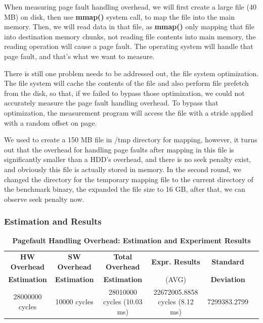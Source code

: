 When measuring page fault handling overhead, we will first create a large file (40 MB) on disk, then use \textbf{mmap()} system call, to map the file into the main memory. Then, we will read data in that file, as \textbf{mmap()} only mapping that file into destination memory chunks, not reading file contents into main memory, the reading operation will cause a page fault. The operating system will handle that page fault, and that's what we want to measure.

There is still one problem needs to be addressed out, the file system optimization. The file system will cache the contents of the file and also perform file prefetch from the disk, so that, if we failed to bypass those optimization, we could not accurately measure the page fault handling overhead. To bypass that optimization, the measurement program will access the file with a stride applied with a random offset on page.

We used to create a 150 MB file in /tmp directory for mapping, however, it turns out that the overhead for handling page faults after mapping in this file is significantly smaller than a HDD's overhead, and there is no seek penalty exist, and obviously this file is actually stored in memory. In the second round, we changed the directory for the temporary mapping file to the current directory of the benchmark binary, the expanded the file size to 16 GB, after that, we can observe seek penalty now.

\subsubsection{Estimation and Results}

\begin{table}[ht]
  \centering
  \caption{\textbf{Pagefault Handling Overhead: Estimation and Experiment Results}}
  \hspace*{-3em}\begin{threeparttable}
  \begin{tabular}{cccccc}
  \hline
        \textbf{HW Overhead} & \textbf{SW Overhead } & \textbf{Total Overhead} & \textbf{Expr. Results} & \textbf{Standard}\\
        \textbf{Estimation}       &  \textbf{Estimation}         & \textbf{Estimation}  & (AVG)   & \textbf{Deviation} \\
  \hline
        28000000 cycles & 10000 cycles & 28010000 cycles (10.03 ms)  & 22672005.8858 cycles (8.12 ms) & 7299383.2799 \\
  \hline
  \end{tabular}
  \end{threeparttable}
  \label{pagefault_handle_time}
\end{table}

